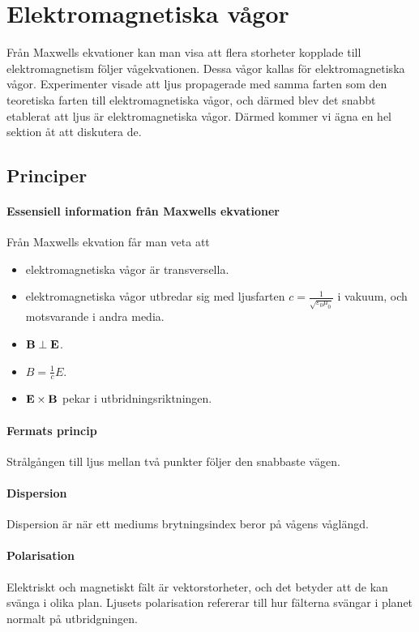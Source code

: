 \section{Elektromagnetiska vågor}
Från Maxwells ekvationer kan man visa att flera storheter kopplade till elektromagnetism följer vågekvationen. Dessa vågor kallas för elektromagnetiska vågor. Experimenter visade att ljus propagerade med samma farten som den teoretiska farten till elektromagnetiska vågor, och därmed blev det snabbt etablerat att ljus är elektromagnetiska vågor. Därmed kommer vi ägna en hel sektion åt att diskutera de.

\subsection{Principer}

\paragraph{Essensiell information från Maxwells ekvationer}
Från Maxwells ekvation får man veta att
\begin{itemize}
	\item elektromagnetiska vågor är transversella.
	\item elektromagnetiska vågor utbredar sig med ljusfarten $c = \frac{1}{\sqrt{\varepsilon_0\mu_0}}$ i vakuum, och motsvarande i andra media.
	\item $\vect{B}\perp\vect{E}$.
	\item $B = \frac{1}{c}E$.
	\item $\vect{E}\times\vect{B}$ pekar i utbridningsriktningen.
\end{itemize}

\paragraph{Fermats princip}
Strålgången till ljus mellan två punkter följer den snabbaste vägen.

\paragraph{Dispersion}
Dispersion är när ett mediums brytningsindex beror på vågens våglängd.

\paragraph{Polarisation}
Elektriskt och magnetiskt fält är vektorstorheter, och det betyder att de kan svänga i olika plan. Ljusets polarisation refererar till hur fälterna svängar i planet normalt på utbridgningen.

